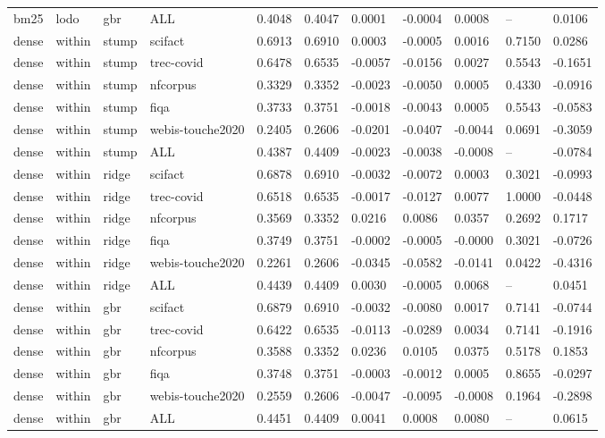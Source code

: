\begin{table}[t]
\begin{tabular}{lllllllllll}
bm25 & lodo & gbr & ALL & 0.4048 & 0.4047 & 0.0001 & -0.0004 & 0.0008 & -- & 0.0106 \\
dense & within & stump & scifact & 0.6913 & 0.6910 & 0.0003 & -0.0005 & 0.0016 & 0.7150 & 0.0286 \\
dense & within & stump & trec-covid & 0.6478 & 0.6535 & -0.0057 & -0.0156 & 0.0027 & 0.5543 & -0.1651 \\
dense & within & stump & nfcorpus & 0.3329 & 0.3352 & -0.0023 & -0.0050 & 0.0005 & 0.4330 & -0.0916 \\
dense & within & stump & fiqa & 0.3733 & 0.3751 & -0.0018 & -0.0043 & 0.0005 & 0.5543 & -0.0583 \\
dense & within & stump & webis-touche2020 & 0.2405 & 0.2606 & -0.0201 & -0.0407 & -0.0044 & 0.0691 & -0.3059 \\
dense & within & stump & ALL & 0.4387 & 0.4409 & -0.0023 & -0.0038 & -0.0008 & -- & -0.0784 \\
dense & within & ridge & scifact & 0.6878 & 0.6910 & -0.0032 & -0.0072 & 0.0003 & 0.3021 & -0.0993 \\
dense & within & ridge & trec-covid & 0.6518 & 0.6535 & -0.0017 & -0.0127 & 0.0077 & 1.0000 & -0.0448 \\
dense & within & ridge & nfcorpus & 0.3569 & 0.3352 & 0.0216 & 0.0086 & 0.0357 & 0.2692 & 0.1717 \\
dense & within & ridge & fiqa & 0.3749 & 0.3751 & -0.0002 & -0.0005 & -0.0000 & 0.3021 & -0.0726 \\
dense & within & ridge & webis-touche2020 & 0.2261 & 0.2606 & -0.0345 & -0.0582 & -0.0141 & 0.0422 & -0.4316 \\
dense & within & ridge & ALL & 0.4439 & 0.4409 & 0.0030 & -0.0005 & 0.0068 & -- & 0.0451 \\
dense & within & gbr & scifact & 0.6879 & 0.6910 & -0.0032 & -0.0080 & 0.0017 & 0.7141 & -0.0744 \\
dense & within & gbr & trec-covid & 0.6422 & 0.6535 & -0.0113 & -0.0289 & 0.0034 & 0.7141 & -0.1916 \\
dense & within & gbr & nfcorpus & 0.3588 & 0.3352 & 0.0236 & 0.0105 & 0.0375 & 0.5178 & 0.1853 \\
dense & within & gbr & fiqa & 0.3748 & 0.3751 & -0.0003 & -0.0012 & 0.0005 & 0.8655 & -0.0297 \\
dense & within & gbr & webis-touche2020 & 0.2559 & 0.2606 & -0.0047 & -0.0095 & -0.0008 & 0.1964 & -0.2898 \\
dense & within & gbr & ALL & 0.4451 & 0.4409 & 0.0041 & 0.0008 & 0.0080 & -- & 0.0615 \\

\end{tabular}
\end{table}
